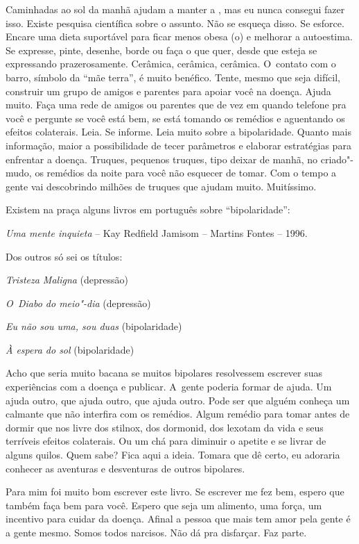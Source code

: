 Caminhadas ao sol da manhã ajudam a manter a , mas eu nunca
consegui fazer isso. Existe pesquisa científica sobre o assunto. Não se
esqueça disso. Se esforce. Encare uma dieta suportável para ficar menos
obesa (o) e melhorar a autoestima. Se expresse, pinte, desenhe, borde ou
faça o que quer, desde que esteja se expressando prazerosamente.
Cerâmica, cerâmica, cerâmica. O~contato com o barro, símbolo da ``mãe
terra'', é muito benéfico. Tente, mesmo que seja difícil, construir um
grupo de amigos e parentes para apoiar você na doença. Ajuda muito. Faça
uma rede de amigos ou parentes que de vez em quando telefone pra você e
pergunte se você está bem, se está tomando os remédios e aguentando os
efeitos colaterais. Leia. Se informe. Leia muito sobre a bipolaridade.
Quanto mais informação, maior a possibilidade de tecer parâmetros e
elaborar estratégias para enfrentar a doença. Truques, pequenos truques,
tipo deixar de manhã, no criado"-mudo, os remédios da noite para você não
esquecer de tomar. Com o tempo a gente vai descobrindo milhões de
truques que ajudam muito. Muitíssimo.

Existem na praça alguns livros em português sobre ``bipolaridade'':

\emph{Uma mente inquieta} -- Kay Redfield Jamisom -- Martins Fontes --
1996.

Dos outros só sei os títulos:

\emph{Tristeza Maligna} (depressão)

\emph{O~Diabo do meio"-dia} (depressão)

\emph{Eu não sou uma, sou duas} (bipolaridade)

\emph{À espera do sol} (bipolaridade)

Acho que seria muito bacana se muitos bipolares resolvessem escrever
suas experiências com a doença e publicar. A~gente poderia formar 
  de ajuda. Um ajuda outro, que ajuda outro, que ajuda outro.
Pode ser que alguém conheça um calmante que não interfira com os
remédios. Algum remédio para tomar antes de dormir que nos livre dos
stilnox, dos dormonid, dos lexotam da vida e seus terríveis efeitos
colaterais. Ou um chá para diminuir o apetite e se livrar de alguns
quilos. Quem sabe? Fica aqui a ideia. Tomara que dê certo, eu adoraria
conhecer as aventuras e desventuras de outros bipolares.

Para mim foi muito bom escrever este livro. Se escrever me fez bem,
espero que também faça bem para você. Espero que seja um alimento, uma
força, um incentivo para cuidar da doença. Afinal a pessoa que mais tem
amor pela gente é a gente mesmo. Somos todos narcisos. Não dá pra
disfarçar. Faz parte.

